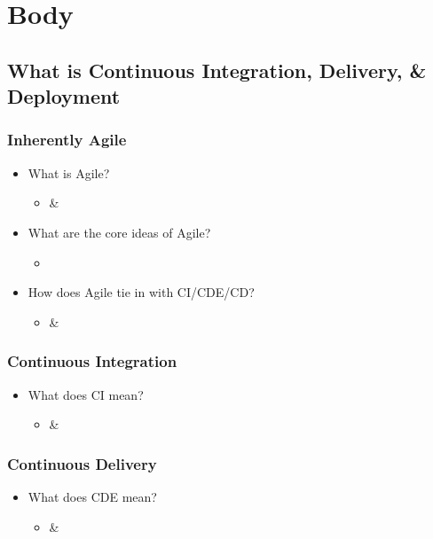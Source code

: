 \documentclass[11pt,a4paper]{article}
\begin{document}
\section{Body}
	\subsection{What is Continuous Integration, Delivery, \& Deployment}
		\subsubsection{Inherently Agile}
		\begin{itemize}[noitemsep]
			\item What is Agile?
			\begin{itemize}
				\item \cite{bosch_2014} \& \cite{meyer_2014}
			\end{itemize}
			\item What are the core ideas of Agile?
			\begin{itemize}
				\item \cite{meyer_2014}
			\end{itemize}
			\item How does Agile tie in with CI/CDE/CD?
			\begin{itemize}
				\item \cite{shahin_babar_zhu_2017} \& \cite{stackify_2018}
			\end{itemize}
		\end{itemize}
		\vspace{-7mm}
		\subsubsection{Continuous Integration}
		\begin{itemize}[noitemsep]
			\item What does CI mean?
			\begin{itemize}
				\item \cite{shahin_babar_zhu_2017} \& \cite{stackify_2018}
			\end{itemize}
		\end{itemize}
		\subsubsection{Continuous Delivery}
		\begin{itemize}[noitemsep]
			\item What does CDE mean?
			\begin{itemize}
				\item \cite{shahin_babar_zhu_2017} \& \cite{stackify_2018}
			\end{itemize}
		\end{itemize}
\end{document}
